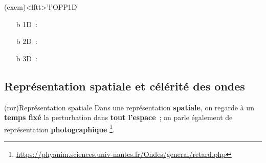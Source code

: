 \documentclass[../../main/main.tex]{subfiles}
\begin{document}
\begin{tcb}(exem)<lftt>'l'{OPP1D}
	\begin{itemize}
		\item[b]{1D}~:
		\item[b]{2D}~:
		\item[b]{3D}~:
	\end{itemize}
	\vspace{-15pt}
\end{tcb}

\subsection{Représentation spatiale et célérité des ondes}

\begin{tcb}[sidebyside, lefthand ratio=.45](ror){Représentation spatiale}
	Dans une représentation \textbf{spatiale}, on regarde à un \textbf{temps
		fixé} la perturbation dans \textbf{tout l'espace}~; on parle également de
	représentation \textbf{photographique}%
	\footnote{\url{https://phyanim.sciences.univ-nantes.fr/Ondes/general/retard.php}}.
	\tcblower
	\begin{center}
		\vspace{-15pt}
	\end{center}
\end{tcb}
\end{document}
